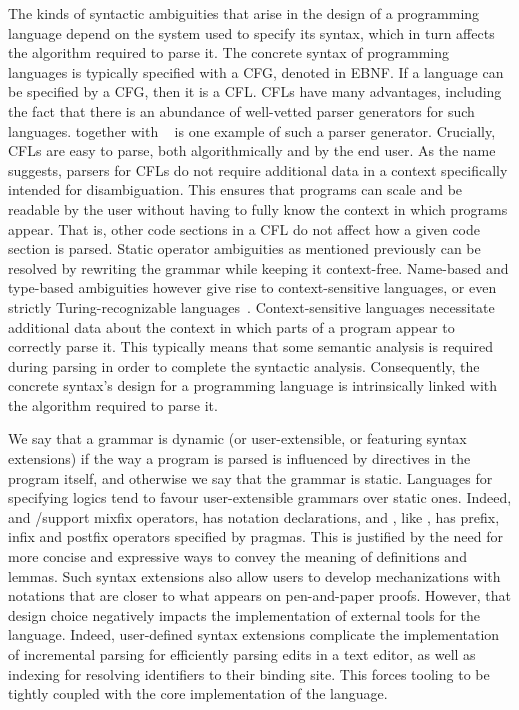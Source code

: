 
The kinds of syntactic ambiguities that arise in the design of a programming language depend on the system used to specify its syntax, which in turn affects the algorithm required to parse it.
The concrete syntax of programming languages is typically specified with a \ac{CFG}, denoted in \ac{EBNF}.
If a language can be specified by a \ac{CFG}, then it is a \ac{CFL}.
\Acp{CFL} have many advantages, including the fact that there is an abundance of well-vetted parser generators for such languages.
\ocamllex together with \ocamlyacc~\cite{smith2007ocamllex} is one example of such a parser generator.
Crucially, \acp{CFL} are easy to parse, both algorithmically and by the end user.
As the name suggests, parsers for \acp{CFL} do not require additional data in a context specifically intended for disambiguation.
This ensures that programs can scale and be readable by the user without having to fully know the context in which programs appear.
That is, other code sections in a \ac{CFL} do not affect how a given code section is parsed.
Static operator ambiguities as mentioned previously can be resolved by rewriting the grammar while keeping it context-free.
Name-based and type-based ambiguities however give rise to context-sensitive languages, or even strictly Turing-recognizable languages~\cite{chomsky1956three}.
Context-sensitive languages necessitate additional data about the context in which parts of a program appear to correctly parse it.
This typically means that some semantic analysis is required during parsing in order to complete the syntactic analysis.
Consequently, the concrete syntax's design for a programming language is intrinsically linked with the algorithm required to parse it.


We say that a grammar is dynamic (or user-extensible, or featuring syntax extensions) if the way a program is parsed is influenced by directives in the program itself, and otherwise we say that the grammar is static.
Languages for specifying logics tend to favour user-extensible grammars over static ones.
Indeed, \Agda and \Isabelle/\HOL support mixfix operators, \Coq has notation declarations, and \Beluga, like \Twelf, has prefix, infix and postfix operators specified by pragmas.
This is justified by the need for more concise and expressive ways to convey the meaning of definitions and lemmas.
Such syntax extensions also allow users to develop mechanizations with notations that are closer to what appears on pen-and-paper proofs.
However, that design choice negatively impacts the implementation of external tools for the language.
Indeed, user-defined syntax extensions complicate the implementation of incremental parsing for efficiently parsing edits in a text editor, as well as indexing for resolving identifiers to their binding site.
This forces tooling to be tightly coupled with the core implementation of the language.

